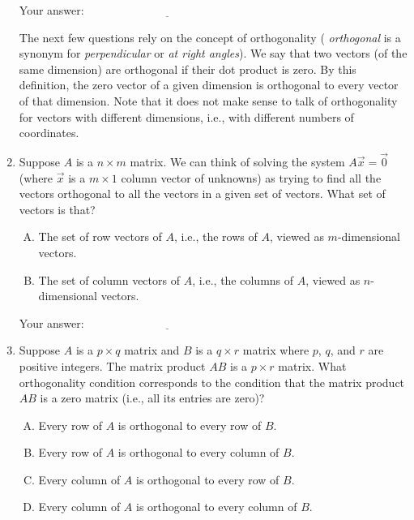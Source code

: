 \documentclass[10pt]{amsart}
\begin{document}
\begin{enumerate}
  \vspace{0.1in}
  Your answer: $\underline{\qquad\qquad\qquad\qquad\qquad\qquad\qquad}$
  \vspace{0.5in}

  The next few questions rely on the concept of orthogonality ({\em
    orthogonal} is a synonym for {\em perpendicular} or {\em at right
    angles}). We say that two vectors (of the same dimension) are
  orthogonal if their dot product is zero. By this definition, the
  zero vector of a given dimension is orthogonal to every vector of
  that dimension. Note that it does not make sense to talk of
  orthogonality for vectors with different dimensions, i.e., with
  different numbers of coordinates.

\item Suppose $A$ is a $n \times m$ matrix. We can think of solving
  the system $A\vec{x} = \vec{0}$ (where $\vec{x}$ is a $m \times 1$
  column vector of unknowns) as trying to find all the vectors
  orthogonal to all the vectors in a given set of vectors. What set of
  vectors is that?

  \begin{enumerate}[(A)]
  \item The set of row vectors of $A$, i.e., the rows of $A$, viewed
    as $m$-dimensional vectors.
  \item The set of column vectors of $A$, i.e., the columns of $A$,
    viewed as $n$-dimensional vectors.
  \end{enumerate}

  \vspace{0.1in}
  Your answer: $\underline{\qquad\qquad\qquad\qquad\qquad\qquad\qquad}$
  \vspace{0.1in}

\item Suppose $A$ is a $p \times q$ matrix and $B$ is a $q \times r$
  matrix where $p$, $q$, and $r$ are positive integers. The matrix
  product $AB$ is a $p \times r$ matrix. What orthogonality condition
  corresponds to the condition that the matrix product $AB$ is a zero
  matrix (i.e., all its entries are zero)?

  \begin{enumerate}[(A)]
  \item Every row of $A$ is orthogonal to every row of $B$.
  \item Every row of $A$ is orthogonal to every column of $B$.
  \item Every column of $A$ is orthogonal to every row of $B$.
  \item Every column of $A$ is orthogonal to every column of $B$.
  \end{enumerate}


\end{enumerate}
\end{document}
